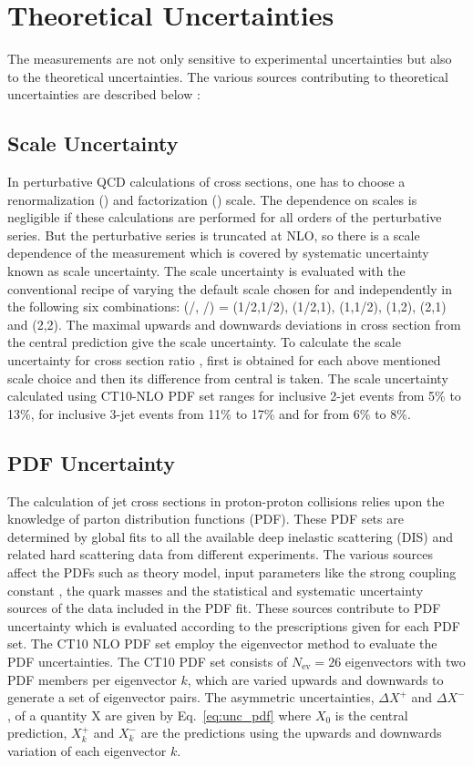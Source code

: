 \section{Theoretical Uncertainties}
The measurements are not only sensitive to experimental uncertainties but also to the theoretical uncertainties. The various sources contributing to theoretical uncertainties are described below : 

\subsection{Scale Uncertainty}
In perturbative QCD calculations of cross sections, one has to choose a renormalization (\mur) and factorization (\muf) scale. The dependence on scales is negligible if these calculations are performed for all orders of the perturbative series. But the perturbative series is truncated at NLO, so there is a scale dependence of the measurement which is covered by systematic uncertainty known as scale uncertainty. The scale uncertainty is evaluated with the conventional recipe of varying the default scale \httwo chosen for \mur and \muf independently in the following six combinations: (\mur/\httwo, \muf/\httwo) = (1/2,1/2), (1/2,1), (1,1/2), (1,2), (2,1) and (2,2). The maximal upwards and downwards deviations in cross section from the central prediction give the scale uncertainty. To calculate the scale uncertainty for cross section ratio \ratio, first \ratio is obtained for each above mentioned scale choice and then its difference from central \ratio is taken. The scale uncertainty calculated using CT10-NLO PDF set ranges for inclusive 2-jet events from 5\% to 13\%, for inclusive 3-jet events from 11\% to 17\% and for \ratio from 6\% to 8\%.

\subsection{PDF Uncertainty}
The calculation of jet cross sections in proton-proton collisions relies upon the knowledge of parton distribution functions (PDF). These PDF sets are determined by global fits to all the available deep inelastic scattering (DIS) and related hard scattering data from different experiments. The various sources affect the PDFs such as theory model, input parameters like the strong coupling constant \alpsns, the quark masses and the statistical and systematic uncertainty sources of the data included in the PDF fit. These sources contribute to PDF uncertainty which is evaluated according to the prescriptions given for each PDF set. The CT10 NLO PDF set \cite{Lai:2010vv,Pumplin:2002vw} employ the eigenvector method to evaluate the PDF uncertainties. The CT10 PDF set consists of $N_\mathrm{ev}=26$ eigenvectors with two PDF members per eigenvector $k$, which are varied upwards and downwards to generate a set of eigenvector pairs. The asymmetric uncertainties, $\Delta X^{+}$ and $\Delta X^{-}$, of a quantity X are given by Eq.~\ref{eq:unc_pdf} where $X_0$ is the central prediction, $X^{+}_k$ and $X^{-}_k$ are the predictions using the upwards and downwards variation of each eigenvector $k$. 

